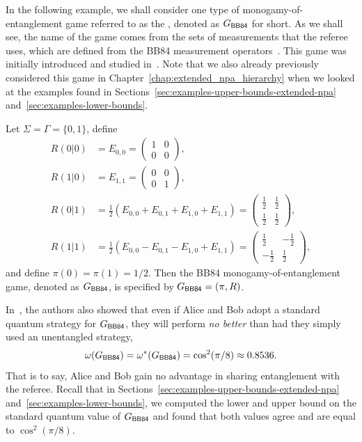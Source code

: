 In the following example, we shall consider one type of monogamy-of-entanglement game referred to as the , denoted as $G_{\BB84}$ for short. As we shall see, the name of the game comes from the sets of measurements that the referee uses, which are defined from the BB84 measurement operators~\cite{Bennett1984}. This game was initially introduced and studied in~\cite{Tomamichel2013}. Note that we also already previously considered this game in Chapter~\ref{chap:extended_npa_hierarchy} when we looked at the examples found in Sections~\ref{sec:examples-upper-bounds-extended-npa} and~\ref{sec:examples-lower-bounds}.
\begin{example}\label{ex:bb84-monogamy-game}
	Let $\Sigma = \Gamma = \{0,1\}$, define 
		\begin{equation} \label{eq:bb84-meas-ops}
	\begin{aligned}
		R(0|0) &= E_{0,0} = \begin{pmatrix} 1 & 0 \\ 0 & 0 \end{pmatrix}, \\
		R(1|0) &= E_{1,1} = \begin{pmatrix} 0 & 0 \\ 0 & 1 \end{pmatrix}, \\
		R(0|1) &= \frac{1}{2}\left( E_{0,0} + E_{0,1} + E_{1,0} + E_{1,1} \right) = \begin{pmatrix} \frac{1}{2} & \frac{1}{2} \\ \frac{1}{2} & \frac{1}{2} \end{pmatrix} , \\
		R(1|1) &= \frac{1}{2}\left( E_{0,0} - E_{0,1} - E_{1,0} + E_{1,1} \right) = \begin{pmatrix} \frac{1}{2} & -\frac{1}{2} \\ -\frac{1}{2} & \frac{1}{2} \end{pmatrix},
	\end{aligned}
	\end{equation}
	and define $\pi(0) = \pi(1) = 1/2$. Then the BB84 monogamy-of-entanglement game, denoted as $G_{\BB84}$, is specified by $G_{\BB84} = (\pi,R)$. 
\end{example}
In~\cite{Tomamichel2013}, the authors also showed that even if Alice and Bob adopt a standard quantum strategy for $G_{\BB84}$, they will perform \emph{no better} than had they simply used an unentangled strategy, 
\begin{align}
	\omega(G_{\BB84}) = \omega^*(G_{\BB84}) = \cos^2(\pi/8) \approx 0.8536.
\end{align}  
That is to say, Alice and Bob gain no advantage in sharing entanglement with the referee. Recall that in Sections~\ref{sec:examples-upper-bounds-extended-npa} and~\ref{sec:examples-lower-bounds}, we computed the lower and upper bound on the standard quantum value of $G_{\BB84}$ and found that both values agree and are equal to $\cos^2(\pi/8)$. 


